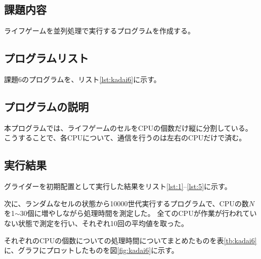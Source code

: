 \documentclass[a4j,titlepage]{jsarticle}
\begin{document}
\subsection{課題内容}
ライフゲームを並列処理で実行するプログラムを作成する。

\subsection{プログラムリスト}
課題6のプログラムを、リスト\ref{lst:kadai6}に示す。



\subsection{プログラムの説明}
本プログラムでは、ライフゲームのセルをCPUの個数だけ縦に分割している。
こうすることで、各CPUについて、通信を行うのは左右のCPUだけで済む。

\subsection{実行結果}
グライダーを初期配置として実行した結果をリスト\ref{lst:1}--\ref{lst:5}に示す。











次に、ランダムなセルの状態から10000世代実行するプログラムで、CPUの数$N$を1$\sim$30個に増やしながら処理時間を測定した。
全てのCPUが作業が行われていない状態で測定を行い、それぞれ10回の平均値を取った。

それぞれのCPUの個数についての処理時間についてまとめたものを表\ref{tb:kadai6}に、グラフにプロットしたものを図\ref{fig:kadai6}に示す。
\end{document}
